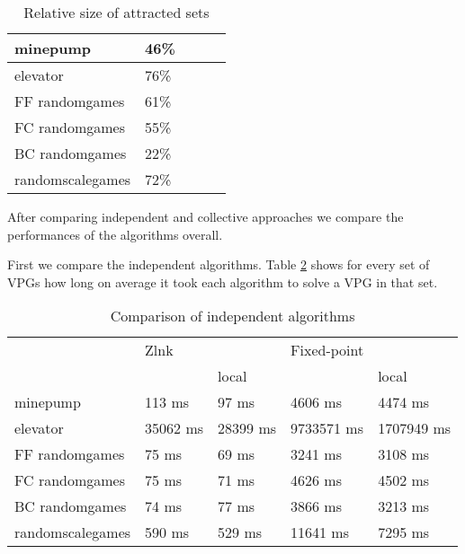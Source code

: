 \begin{table}[h]
	\centering
	\begin{tabular}{|l|l|l|l|l|}
		\hline
		minepump& 46\%\\ \hline
		elevator& 76\%\\ \hline
		FF randomgames& 61\%\\ \hline
		FC randomgames& 55\%\\ \hline
		BC randomgames& 22\%\\ \hline
		randomscalegames& 72\%\\ \hline
	\end{tabular}
	\caption{Relative size of attracted sets}
	\label{tab_attracted_set_size}
\end{table}

After comparing independent and collective approaches we compare the performances of the algorithms overall.

First we compare the independent algorithms. Table \ref{tab_compare_independent_algs} shows for every set of VPGs how long on average it took each algorithm to solve a VPG in that set.
\begin{table}[h]
	\centering
	\begin{tabular}{|l|l|l|l|l|}
		\hline
		& Zlnk & & Fixed-point & \\
		& & local & & local \\
		\hline
		minepump& 113 ms& 97 ms& 4606 ms& 4474 ms\\ \hline
		elevator& 35062 ms& 28399 ms& 9733571 ms& 1707949 ms\\ \hline
		FF randomgames& 75 ms& 69 ms& 3241 ms& 3108 ms\\ \hline
		FC randomgames& 75 ms& 71 ms& 4626 ms& 4502 ms\\ \hline
		BC randomgames& 74 ms& 77 ms& 3866 ms& 3213 ms\\ \hline
		randomscalegames& 590 ms& 529 ms& 11641 ms& 7295 ms\\ \hline
	\end{tabular}
	\caption{Comparison of independent algorithms}
	\label{tab_compare_independent_algs}
\end{table}


